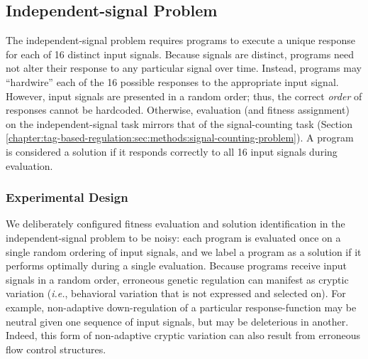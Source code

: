 \subsection{Independent-signal Problem}
\label{chapter:tag-based-regulation:sec:methods:independent-signal-problem}


The independent-signal problem requires programs to execute a unique response for each of 16 distinct input signals. 
Because signals are distinct, programs need not alter their response to any particular signal over time.
Instead, programs may ``hardwire'' each of the 16 possible responses to the appropriate input signal.
However, input signals are presented in a random order; thus, the correct \textit{order} of responses cannot be hardcoded.
Otherwise, evaluation (and fitness assignment) on the independent-signal task mirrors that of the signal-counting task (Section \ref{chapter:tag-based-regulation:sec:methods:signal-counting-problem}).
A program is considered a solution if it responds correctly to all 16 input signals during evaluation.

\subsubsection{Experimental Design}

We deliberately configured fitness evaluation and solution identification in the independent-signal problem to be noisy: each program is evaluated once on a single random ordering of input signals, and we label a program as a solution if it performs optimally during a single evaluation.
Because programs receive input signals in a random order, erroneous genetic regulation can manifest as cryptic variation (\textit{i.e.}, behavioral variation that is not expressed and selected on).
For example, non-adaptive down-regulation of a particular response-function may be neutral given one sequence of input signals, but may be deleterious in another.
Indeed, this form of non-adaptive cryptic variation can also result from erroneous flow control structures. 

